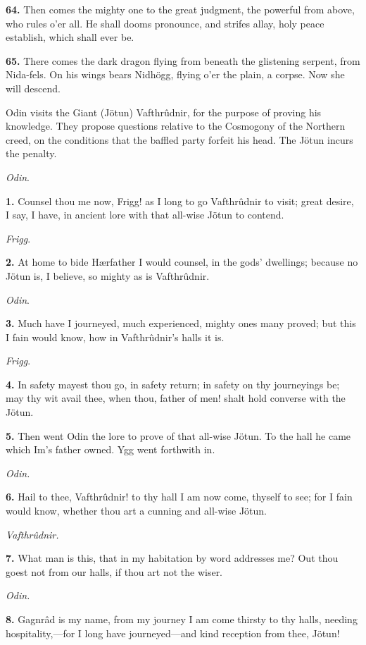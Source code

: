 \textbf{64.} Then comes the mighty one to the great judgment, the powerful
from above, who rules o'er all. He shall dooms pronounce, and strifes
allay, holy peace establish, which shall ever be.

\textbf{65.} There comes the dark dragon flying from beneath the glistening
serpent, from Nida-fels. On his wings bears Nidhögg, flying o'er the
plain, a corpse. Now she will descend.


Odin visits the Giant (Jötun) Vafthrûdnir, for the purpose of proving
his knowledge. They propose questions relative to the Cosmogony of the
Northern creed, on the conditions that the baffled party forfeit his
head. The Jötun incurs the penalty.

\emph{Odin}.

\textbf{1.} Counsel thou me now, Frigg! as I long to go Vafthrûdnir to visit;
great desire, I say, I have, in ancient lore with that all-wise Jötun
to contend.

\emph{Frigg}.

\textbf{2.} At home to bide Hærfather I would counsel, in the gods'
dwellings; because no Jötun is, I believe, so mighty as is
Vafthrûdnir.

\emph{Odin}.

\textbf{3.} Much have I journeyed, much experienced, mighty ones many proved;
but this I fain would know, how in Vafthrûdnir's halls it is.

\emph{Frigg}.

\textbf{4.} In safety mayest thou go, in safety return; in safety on thy
journeyings be; may thy wit avail thee, when thou, father of men!
shalt hold converse with the Jötun.

\textbf{5.} Then went Odin the lore to prove of that all-wise Jötun. To the
hall he came which Im's father owned. Ygg went forthwith in.

\emph{Odin.}

\textbf{6.} Hail to thee, Vafthrûdnir! to thy hall I am now come, thyself to
see; for I fain would know, whether thou art a cunning and all-wise
Jötun.

\emph{Vafthrûdnir.}

\textbf{7.} What man is this, that in my habitation by word addresses me? Out
thou goest not from our halls, if thou art not the wiser.

\emph{Odin.}

\textbf{8.} Gagnrâd is my name, from my journey I am come thirsty to thy
halls, needing hospitality,—for I long have journeyed—and kind
reception from thee, Jötun!

